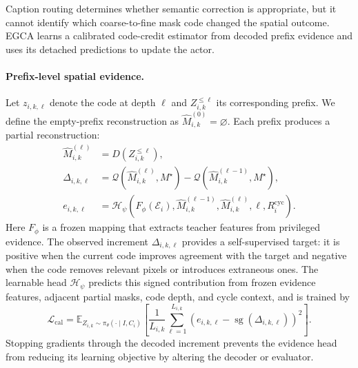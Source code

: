 \documentclass{article}
\begin{document}
Caption routing determines whether semantic correction is appropriate, but it cannot identify which coarse-to-fine mask code changed the spatial outcome. EGCA learns a calibrated code-credit estimator from decoded prefix evidence and uses its detached predictions to update the actor.

\paragraph{Prefix-level spatial evidence.}
Let $z_{i,k,\ell}$ denote the code at depth $\ell$ and $Z_{i,k}^{\le\ell}$ its corresponding prefix. We define the empty-prefix reconstruction as $\widehat M_{i,k}^{(0)}=\varnothing$. Each prefix produces a partial reconstruction:
\begin{equation}\label{eq:egca-evidence}\begin{aligned}
 \widehat M_{i,k}^{(\ell)}&=D(Z_{i,k}^{\le\ell}),\\
 \Delta_{i,k,\ell}&=
 \mathcal Q(\widehat M_{i,k}^{(\ell)},M^\star)
 -\mathcal Q(\widehat M_{i,k}^{(\ell-1)},M^\star),\\
 e_{i,k,\ell}&=
 \mathcal H_\psi\!\left(
 F_\phi(\mathcal E_i),
 \widehat M_{i,k}^{(\ell-1)},
 \widehat M_{i,k}^{(\ell)},
 \ell,R_i^{\mathrm{cyc}}
 \right).
\end{aligned}\end{equation}
Here $F_\phi$ is a frozen mapping that extracts teacher features from privileged evidence. The observed increment $\Delta_{i,k,\ell}$ provides a self-supervised target: it is positive when the current code improves agreement with the target and negative when the code removes relevant pixels or introduces extraneous ones. The learnable head $\mathcal H_\psi$ predicts this signed contribution from frozen evidence features, adjacent partial masks, code depth, and cycle context, and is trained by
\begin{equation}\label{eq:egca-calibration}
 \mathcal L_{\mathrm{cal}}=
 \mathbb E_{Z_{i,k}\sim\pi_\theta(\cdot\mid I,C_i)}
 \left[
 \frac{1}{L_{i,k}}\sum_{\ell=1}^{L_{i,k}}
 \left(e_{i,k,\ell}-\operatorname{sg}(\Delta_{i,k,\ell})\right)^2
 \right].
\end{equation}
Stopping gradients through the decoded increment prevents the evidence head from reducing its learning objective by altering the decoder or evaluator.
\end{document}
